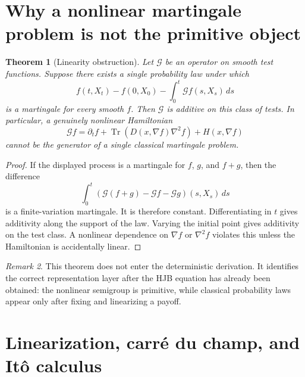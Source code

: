 \documentclass[12pt, letterpaper]{amsart}
\providecommand{\Tr}{\operatorname{Tr}}
\theoremstyle{plain}
\newtheorem{theorem}{Theorem}[section]
\theoremstyle{definition}
\theoremstyle{remark}
\newtheorem{remark}[theorem]{Remark}
\begin{document}
\section{Why a nonlinear martingale problem is not the primitive object}
\label{sec:no_nonlinear_mp}

\begin{theorem}[Linearity obstruction]
\label{thm:linearity_obstruction}
Let $\mathcal G$ be an operator on smooth test functions.  Suppose there exists a single probability law under which
\begin{equation}
    f(t,X_t)-f(0,X_0)-\int_0^t\mathcal G f(s,X_s)\,ds
\end{equation}
is a martingale for every smooth $f$.  Then $\mathcal G$ is additive on this class of tests.  In particular, a genuinely nonlinear Hamiltonian
\begin{equation}
    \mathcal G f=\partial_tf+\Tr(D(x,\nabla f)\nabla^2f)+H(x,\nabla f)
\end{equation}
cannot be the generator of a single classical martingale problem.
\end{theorem}

\begin{proof}
If the displayed process is a martingale for $f$, $g$, and $f+g$, then the difference
\begin{equation}
    \int_0^t\left(\mathcal G(f+g)-\mathcal Gf-\mathcal Gg\right)(s,X_s)\,ds
\end{equation}
is a finite-variation martingale.  It is therefore constant.  Differentiating in $t$ gives additivity along the support of the law.  Varying the initial point gives additivity on the test class.  A nonlinear dependence on $\nabla f$ or $\nabla^2f$ violates this unless the Hamiltonian is accidentally linear.
\end{proof}

\begin{remark}
This theorem does not enter the deterministic derivation.  It identifies the correct representation layer after the HJB equation has already been obtained: the nonlinear semigroup is primitive, while classical probability laws appear only after fixing and linearizing a payoff.
\end{remark}

\section{Linearization, carr\'e du champ, and It\^o calculus}
\label{sec:linearization_calculus}
\end{document}
